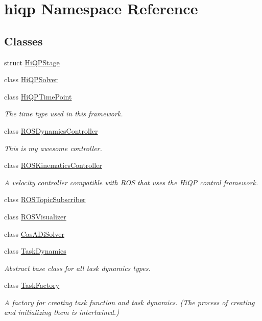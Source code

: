 \hypertarget{namespacehiqp}{\section{hiqp Namespace Reference}
\label{namespacehiqp}
}
\subsection*{Classes}
\begin{DoxyCompactItemize}
\item 
struct \hyperlink{structhiqp_1_1HiQPStage}{Hi\-Q\-P\-Stage}
\item 
class \hyperlink{classhiqp_1_1HiQPSolver}{Hi\-Q\-P\-Solver}
\item 
class \hyperlink{classhiqp_1_1HiQPTimePoint}{Hi\-Q\-P\-Time\-Point}
\begin{DoxyCompactList}\small\item\em The time type used in this framework. \end{DoxyCompactList}\item 
class \hyperlink{classhiqp_1_1ROSDynamicsController}{R\-O\-S\-Dynamics\-Controller}
\begin{DoxyCompactList}\small\item\em This is my awesome controller. \end{DoxyCompactList}\item 
class \hyperlink{classhiqp_1_1ROSKinematicsController}{R\-O\-S\-Kinematics\-Controller}
\begin{DoxyCompactList}\small\item\em A velocity controller compatible with R\-O\-S that uses the Hi\-Q\-P control framework. \end{DoxyCompactList}\item 
class \hyperlink{classhiqp_1_1ROSTopicSubscriber}{R\-O\-S\-Topic\-Subscriber}
\item 
class \hyperlink{classhiqp_1_1ROSVisualizer}{R\-O\-S\-Visualizer}
\item 
class \hyperlink{classhiqp_1_1CasADiSolver}{Cas\-A\-Di\-Solver}
\item 
class \hyperlink{classhiqp_1_1TaskDynamics}{Task\-Dynamics}
\begin{DoxyCompactList}\small\item\em Abstract base class for all task dynamics types. \end{DoxyCompactList}\item 
class \hyperlink{classhiqp_1_1TaskFactory}{Task\-Factory}
\begin{DoxyCompactList}\small\item\em A factory for creating task function and task dynamics. (The process of creating and initializing them is intertwined.) \end{DoxyCompactList}\item 

\end{DoxyCompactItemize}
